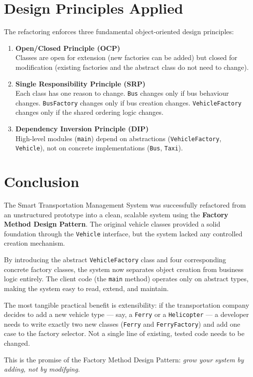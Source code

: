 \documentclass[12pt, a4paper]{article}
\begin{document}
\section{Design Principles Applied}

The refactoring enforces three fundamental object-oriented design principles:

\begin{enumerate}[leftmargin=*, label=\textbf{\arabic*.}]
    \item \textbf{Open/Closed Principle (OCP)} \\
    Classes are open for extension (new factories can be added) but closed for modification (existing factories and the abstract class do not need to change).

    \item \textbf{Single Responsibility Principle (SRP)} \\
    Each class has one reason to change. \texttt{Bus} changes only if bus behaviour changes. \texttt{BusFactory} changes only if bus creation changes. \texttt{VehicleFactory} changes only if the shared ordering logic changes.

    \item \textbf{Dependency Inversion Principle (DIP)} \\
    High-level modules (\texttt{main}) depend on abstractions (\texttt{VehicleFactory}, \texttt{Vehicle}), not on concrete implementations (\texttt{Bus}, \texttt{Taxi}).
\end{enumerate}

\section{Conclusion}

The Smart Transportation Management System was successfully refactored from an unstructured prototype into a clean, scalable system using the \textbf{Factory Method Design Pattern}. The original vehicle classes provided a solid foundation through the \texttt{Vehicle} interface, but the system lacked any controlled creation mechanism.

By introducing the abstract \texttt{VehicleFactory} class and four corresponding concrete factory classes, the system now separates object creation from business logic entirely. The client code (the \texttt{main} method) operates only on abstract types, making the system easy to read, extend, and maintain.

The most tangible practical benefit is extensibility: if the transportation company decides to add a new vehicle type --- say, a \texttt{Ferry} or a \texttt{Helicopter} --- a developer needs to write exactly two new classes (\texttt{Ferry} and \texttt{FerryFactory}) and add one case to the factory selector. Not a single line of existing, tested code needs to be changed.

This is the promise of the Factory Method Design Pattern: \textit{grow your system by adding, not by modifying.}
\end{document}
